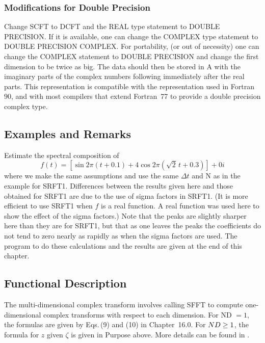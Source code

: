 \documentclass[twoside]{MATH77}
\begin{document}
\subsubsection{Modifications for Double Precision}

Change SCFT to DCFT and the REAL type statement to DOUBLE PRECISION. If it
is available, one can change the COMPLEX type statement to DOUBLE PRECISION
COMPLEX. For portability, (or out of necessity) one can change the COMPLEX
statement to DOUBLE PRECISION and change the first dimension to be twice as
big. The data should then be stored in A with the imaginary parts of the
complex numbers following immediately after the real parts.  This
representation is compatible with the representation used in Fortran
90, and with most compilers that extend Fortran~77 to provide a double
precision complex type.

\subsection{Examples and Remarks}

Estimate the spectral composition of%
$$
f(t)=[\sin 2\pi (t+0.1)+4\cos 2\pi (\sqrt{2}\,t+0.3)]+0i
$$
where we make the same assumptions and use the same $\Delta t$ and N as in
the example for SRFT1. Differences between the results given here and those
obtained for SRFT1 are due to the use of sigma factors in SRFT1. (It is more
efficient to use SRFT1 when $f$ is a real function. A real function was used
here to show the effect of the sigma factors.) Note that the peaks are
slightly sharper here than they are for SRFT1, but that as one leaves the
peaks the coefficients do not tend to zero nearly as rapidly as when the
sigma factors are used. The program to do these calculations and the results
are given at the end of this chapter.

\subsection{Functional Description}

The multi-dimensional complex transform involves calling SFFT to compute
one-dimensional complex transforms with respect to each dimension. For ND $=
1$, the formulas are given by Eqs.\,(9) and (10) in Chapter~16.0. For ${%
\textstyle ND} \geq 1$, the formula for $z$ given $\zeta $ is given in
Purpose above.  More details can be found in \cite{Krogh:1970:CFT}.



\end{document}
